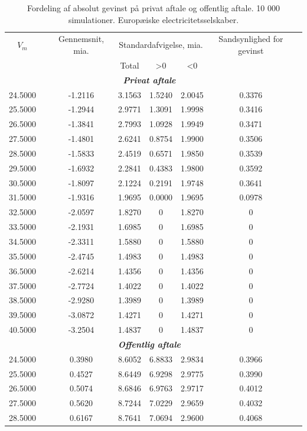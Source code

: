 \documentclass{article}
\begin{document}
\begin{table}[h]
	\caption{Fordeling af absolut gevinst p\aa{} privat aftale og offentlig aftale. 10 000 simulationer. Europæiske electricitetsselskaber.}
	\label{tab:abs_fordeling}
	\begin{tabularx}{\linewidth}{cXcccccr}
	\toprule[1pt] 
	$V_m$ && Gennemsnit, mia. & \multicolumn{3}{c}{Standardafvigelse, mia.}  & Sandsynlighed for gevinst\\
	& & &Total & >0 & <0 \\
	\hline 
	\multicolumn{7}{c}{\emph{\textbf{Privat aftale}}} \\
24.5000&&-1.2116& 3.1563& 1.5240& 2.0045& 0.3376\\
25.5000&&-1.2944& 2.9771& 1.3091& 1.9998& 0.3416\\
26.5000&&-1.3841& 2.7993& 1.0928& 1.9949& 0.3471\\
27.5000&&-1.4801& 2.6241& 0.8754& 1.9900& 0.3506\\
28.5000&&-1.5833& 2.4519& 0.6571& 1.9850& 0.3539\\
29.5000&&-1.6932& 2.2841& 0.4383& 1.9800& 0.3592\\
30.5000&&-1.8097& 2.1224& 0.2191& 1.9748& 0.3641\\
31.5000&&-1.9316& 1.9695& 0.0000& 1.9695& 0.0978\\
32.5000&&-2.0597& 1.8270&0& 1.8270&0\\
33.5000&&-2.1931& 1.6985&0& 1.6985&0\\
34.5000&&-2.3311& 1.5880&0& 1.5880&0\\
35.5000&&-2.4745& 1.4983&0& 1.4983&0\\
36.5000&&-2.6214& 1.4356&0& 1.4356&0\\
37.5000&&-2.7724& 1.4022&0& 1.4022&0\\
38.5000&&-2.9280& 1.3989&0& 1.3989&0\\
39.5000&&-3.0872& 1.4271&0& 1.4271&0\\
40.5000&&-3.2504& 1.4837&0& 1.4837&0\\
\multicolumn{7}{c}{\emph{\textbf{Offentlig aftale}}} \\
 24.5000&&0.3980&8.6052&6.8833&2.9834&0.3966 \\
 25.5000&&0.4527&8.6449&6.9298&2.9775&0.3990\\
 26.5000&&0.5074&8.6846&6.9763&2.9717&0.4012\\
 27.5000&&0.5620&8.7244&7.0229&2.9659&0.4032\\
 28.5000&&0.6167&8.7641&7.0694&2.9600&0.4068\\

\end{tabularx}
\end{table}
\end{document}
